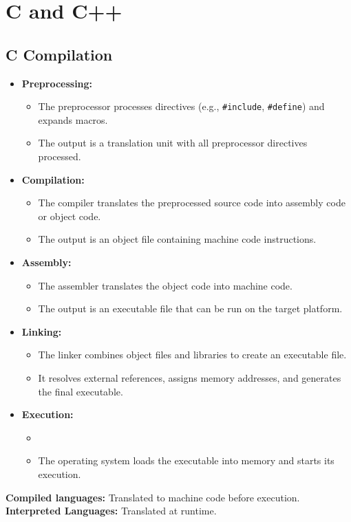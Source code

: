 \documentclass{report}
\begin{document}
\chapter{C and C++}

\section{C Compilation}

\begin{itemize}
	\item \textbf{Preprocessing:}
	      \begin{itemize}
		      \item The preprocessor processes directives (e.g., \texttt{\#include}, \texttt{\#define}) and expands macros.
		      \item The output is a translation unit with all preprocessor directives processed.
	      \end{itemize}
	\item \textbf{Compilation:}
	      \begin{itemize}
		      \item The compiler translates the preprocessed source code into assembly code or object code.
		      \item The output is an object file containing machine code instructions.
	      \end{itemize}
	\item \textbf{Assembly:}
	\begin{itemize}
		\item The assembler translates the object code into machine code.
		\item The output is an executable file that can be run on the target platform.
	\end{itemize}
	\item \textbf{Linking:}
	\begin{itemize}
	      \item The linker combines object files and libraries to create an executable file.
	      \item It resolves external references, assigns memory addresses, and generates the final executable.
	\end{itemize}
	\item \textbf{Execution:}
	\begin{itemize}
		\item 
	      \item The operating system loads the executable into memory and starts its execution.
	\end{itemize}
\end{itemize}

\textbf{Compiled languages:} Translated to machine code before execution.
\textbf{Interpreted Languages:} Translated at runtime.
\end{document}
